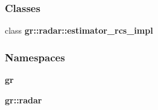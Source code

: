 \subsubsection*{Classes}
\begin{DoxyCompactItemize}
\item 
class {\bf gr\+::radar\+::estimator\+\_\+rcs\+\_\+impl}
\end{DoxyCompactItemize}
\subsubsection*{Namespaces}
\begin{DoxyCompactItemize}
\item 
 {\bf gr}
\item 
 {\bf gr\+::radar}
\end{DoxyCompactItemize}
